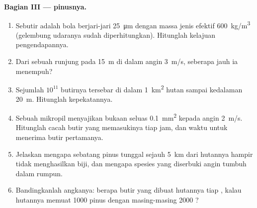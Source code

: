 \begin{problem}
\medskip
\noindent\textbf{Bagian III ---  pinusnya.}
\begin{enumerate}[resume]
  \item Sebutir  adalah bola berjari-jari \qty{25}{\micro m}
        dengan massa jenis efektif \qty{600}{kg/m^3} (gelembung
        udaranya sudah diperhitungkan). Hitunglah kelajuan
        pengendapannya.
  \item Dari sebuah runjung pada \qty{15}{m} di dalam angin
        \qty{3}{m/s}, seberapa jauh ia menempuh?
  \item Sejumlah $10^{11}$ butirnya tersebar di dalam \qty{1}{km^2}
        hutan sampai kedalaman \qty{20}{m}. Hitunglah kepekatannya.
  \item Sebuah mikropil menyajikan bukaan seluas \qty{0.1}{mm^2}
        kepada angin \qty{2}{m/s}. Hitunglah cacah butir yang
        memasukinya tiap jam, dan waktu untuk menerima butir pertamanya.
  \item Jelaskan mengapa sebatang pinus tunggal sejauh \qty{5}{km} dari
        hutannya hampir tidak menghasilkan biji, dan mengapa spesies
        yang diserbuki angin tumbuh dalam rumpun.
  \item Bandingkanlah angkanya: berapa butir  yang dibuat
        hutannya tiap , kalau hutannya memuat \num{1000}
        pinus dengan masing-masing \num{2000} ?
\end{enumerate}


\end{problem}
